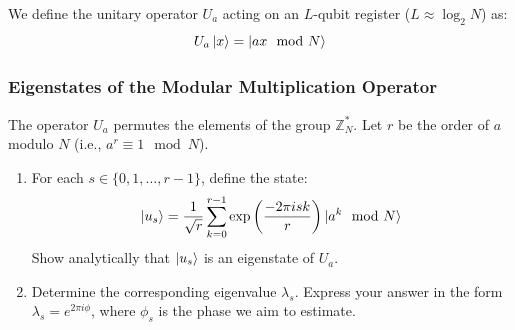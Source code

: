 We define the unitary operator $U_a$ acting on an $L$-qubit register ($L \approx \log_2 N$) as: 
\begin{equation}
    U_a\ket{x} = \ket{ax \mod N}
\end{equation}

\subsubsection{Eigenstates of the Modular Multiplication Operator}
The operator $U_a$ permutes the elements of the group $\mathbb{Z}_N^*$. Let $r$ be the order of $a$ modulo $N$ (i.e., $a^r \equiv 1 \mod N$).

\begin{enumerate}
    \item For each $s \in \{0, 1, \ldots, r-1\}$, define the state:
    \begin{equation}
        \ket{u_s} = \frac{1}{\sqrt{r}}\sum_{k=0}^{r-1}\exp\left(\frac{-2\pi i s k}{r}\right)\ket{a^k \mod N}
    \end{equation}
    Show analytically that $\ket{u_s}$ is an eigenstate of $U_a$. 
    \item Determine the corresponding eigenvalue $\lambda_s$. Express your answer in the form $\lambda_s = e^{2\pi i \phi}$, where $\phi_s$ is the phase we aim to estimate. 
\end{enumerate}
    \noindent{}

